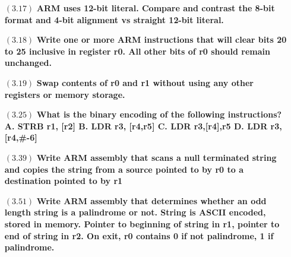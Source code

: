 \documentclass[letterpaper,10pt,titlepage]{article}
\def\braces#1{[#1]}
\begin{document}
\begin{enumerate}
\item[$(3.17)$] \textbf{ARM uses 12-bit literal. Compare and contrast the 8-bit format and 4-bit alignment vs straight 12-bit literal.}


  
\item[$(3.18)$] \textbf{Write one or more ARM instructions that will clear bits 20 to 25 inclusive in register r0. All other bits of r0 should remain unchanged.}


\item[$(3.19)$] \textbf{Swap contents of r0 and r1 without using any other registers or memory storage.}


\item[$(3.25)$] \textbf{What is the binary encoding of the following instructions? A. STRB r1, \braces{r2} B. LDR r3, \braces{r4,r5}\! C. LDR r3,\braces{r4},r5 D. LDR r3, \braces{r4,\#-6}\!}

\item[$(3.39)$] \textbf{Write ARM assembly that scans a null terminated string and copies the string from a source pointed to by r0 to a destination pointed to by r1}



\item[$(3.51)$] \textbf{Write ARM assembly that determines whether an odd length string is a palindrome or not. String is ASCII encoded, stored in memory. Pointer to beginning of string in r1, pointer to end of string in r2. On exit, r0 contains 0 if not palindrome, 1 if palindrome.}



\end{enumerate}
\end{document}
